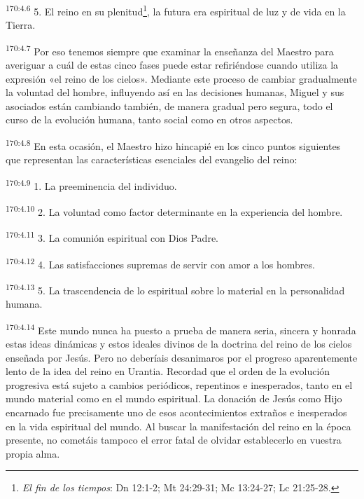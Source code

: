\par 
\textsuperscript{170:4.6} 5. El reino en su plenitud\footnote{\textit{El fin de los tiempos}: Dn 12:1-2; Mt 24:29-31; Mc 13:24-27; Lc 21:25-28.}, la futura era espiritual de luz y de vida en la Tierra.

\par 
\textsuperscript{170:4.7} Por eso tenemos siempre que examinar la enseñanza del Maestro para averiguar a cuál de estas cinco fases puede estar refiriéndose cuando utiliza la expresión «el reino de los cielos». Mediante este proceso de cambiar gradualmente la voluntad del hombre, influyendo así en las decisiones humanas, Miguel y sus asociados están cambiando también, de manera gradual pero segura, todo el curso de la evolución humana, tanto social como en otros aspectos.

\par 
\textsuperscript{170:4.8} En esta ocasión, el Maestro hizo hincapié en los cinco puntos siguientes que representan las características esenciales del evangelio del reino:

\par 
\textsuperscript{170:4.9} 1. La preeminencia del individuo.

\par 
\textsuperscript{170:4.10} 2. La voluntad como factor determinante en la experiencia del hombre.

\par 
\textsuperscript{170:4.11} 3. La comunión espiritual con Dios Padre.

\par 
\textsuperscript{170:4.12} 4. Las satisfacciones supremas de servir con amor a los hombres.

\par 
\textsuperscript{170:4.13} 5. La trascendencia de lo espiritual sobre lo material en la personalidad humana.

\par 
\textsuperscript{170:4.14} Este mundo nunca ha puesto a prueba de manera seria, sincera y honrada estas ideas dinámicas y estos ideales divinos de la doctrina del reino de los cielos enseñada por Jesús. Pero no deberíais desanimaros por el progreso aparentemente lento de la idea del reino en Urantia. Recordad que el orden de la evolución progresiva está sujeto a cambios periódicos, repentinos e inesperados, tanto en el mundo material como en el mundo espiritual. La donación de Jesús como Hijo encarnado fue precisamente uno de esos acontecimientos extraños e inesperados en la vida espiritual del mundo. Al buscar la manifestación del reino en la época presente, no cometáis tampoco el error fatal de olvidar establecerlo en vuestra propia alma.

